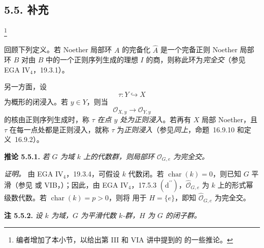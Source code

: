 
\subsection*{5.5. 补充}
\label{sga3:VIIB:5.5}
\footnote{\label{sga3:VIIB:nde:169}编者增加了本小节，以给出第 III 和 VIA 讲中提到的  的一些推论。}

回顾下列定义。若 Noether 局部环 \(A\) 的完备化 \(\widehat A\) 是一个完备正则 Noether 局部环 \(B\) 对由 \(B\) 中的一个正则序列生成的理想 \(I\) 的商，则称此环为\emph{完全交}\textup{（参见 EGA IV\(_4\)，19.3.1）}。

另一方面，设
\[
  \tau:Y\hookrightarrow X
\]
为概形的闭浸入。若 \(y\in Y\)，则当
\[
  \mathcal O_{X,y}\longrightarrow\mathcal O_{Y,y}
\]
的核由正则序列生成时，称 \(\tau\) \emph{在点 \(y\) 处为正则浸入}。若再有 \(X\) 局部 Noether，且 \(\tau\) 在每一点处都是正则浸入，就称 \(\tau\) 为\emph{正则浸入}\textup{（参见\textit{同上}，命题~16.9.10 和定义~16.9.2）}。

\medskip
\noindent\textbf{推论 5.5.1.}
\label{sga3:VIIB:5.5.1}
\textit{若 \(G\) 为域 \(k\) 上的代数群，则局部环 \(\mathcal O_{G,e}\) 为完全交。}

\medskip
\noindent\textit{证明。}
由 EGA IV\(_4\)，19.3.4，可假设 \(k\) 代数闭。若 \(\operatorname{char}(k)=0\)，则已知 \(G\) 平滑\textup{（参见  或 VIB，）}；因此，由 EGA IV\(_4\)，17.5.3 \((\mathrm d^{\prime\prime})\)，\(\widehat{\mathcal O}_{G,e}\) 为 \(k\) 上的形式幂级数代数。若 \(\operatorname{char}(k)=p>0\)，则将  用于 \(H=\{e\}\)，即知 \(\widehat{\mathcal O}_{G,e}\) 为完全交。

\medskip
\noindent\textbf{注 5.5.2.}
\label{sga3:VIIB:5.5.2}
\textit{设 \(k\) 为域，\(G\) 为平滑代数 \(k\)-群，\(H\) 为 \(G\) 的闭子群。}


